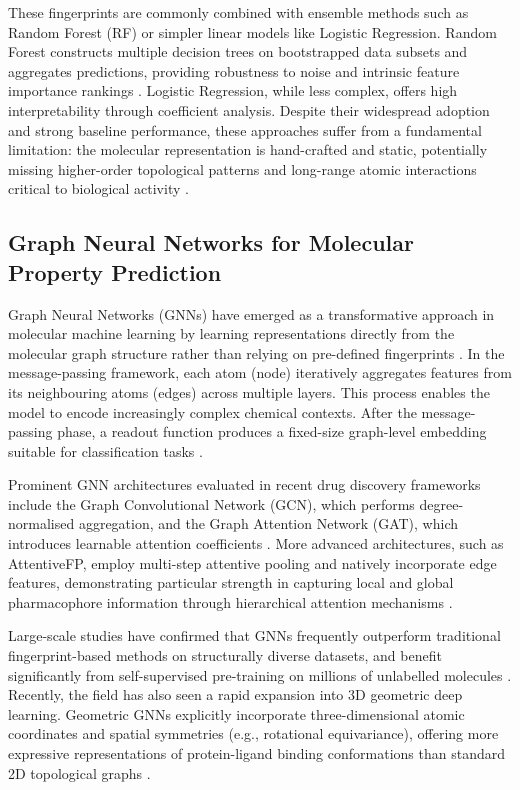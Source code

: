 These fingerprints are commonly combined with ensemble methods such as Random Forest (RF) or simpler linear models like Logistic Regression. Random Forest constructs multiple decision trees on bootstrapped data subsets and aggregates predictions, providing robustness to noise and intrinsic feature importance rankings \parencite{Jiangetal2021}. Logistic Regression, while less complex, offers high interpretability through coefficient analysis. Despite their widespread adoption and strong baseline performance, these approaches suffer from a fundamental limitation: the molecular representation is hand-crafted and static, potentially missing higher-order topological patterns and long-range atomic interactions critical to biological activity \parencite{Jiangetal2021, Dengetal2022}.

\subsection{Graph Neural Networks for Molecular Property Prediction}

Graph Neural Networks (GNNs) have emerged as a transformative approach in molecular machine learning by learning representations directly from the molecular graph structure rather than relying on pre-defined fingerprints \parencite{Gilmeretal2017}. In the message-passing framework, each atom (node) iteratively aggregates features from its neighbouring atoms (edges) across multiple layers. This process enables the model to encode increasingly complex chemical contexts. After the message-passing phase, a readout function produces a fixed-size graph-level embedding suitable for classification tasks \parencite{Gilmeretal2017}.

Prominent GNN architectures evaluated in recent drug discovery frameworks include the Graph Convolutional Network (GCN), which performs degree-normalised aggregation, and the Graph Attention Network (GAT), which introduces learnable attention coefficients \parencite{Zhangetal2021}. More advanced architectures, such as AttentiveFP, employ multi-step attentive pooling and natively incorporate edge features, demonstrating particular strength in capturing local and global pharmacophore information through hierarchical attention mechanisms \parencite{Xiongetal2020, Jiangetal2021}.

Large-scale studies have confirmed that GNNs frequently outperform traditional fingerprint-based methods on structurally diverse datasets, and benefit significantly from self-supervised pre-training on millions of unlabelled molecules \parencite{Huetal2020}. Recently, the field has also seen a rapid expansion into 3D geometric deep learning. Geometric GNNs explicitly incorporate three-dimensional atomic coordinates and spatial symmetries (e.g., rotational equivariance), offering more expressive representations of protein-ligand binding conformations than standard 2D topological graphs \parencite{Atzetal2021}.

